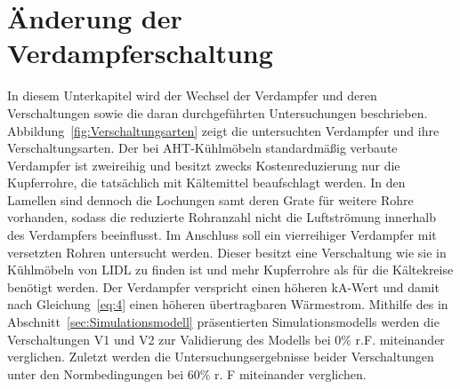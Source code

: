 \clearpage





\section{Änderung der Verdampferschaltung}
\label{sec:Änderung der Verdampferschaltung}

In diesem Unterkapitel wird der Wechsel der Verdampfer und deren Verschaltungen sowie die daran durchgeführten Untersuchungen beschrieben. Abbildung~\ref{fig:Verschaltungsarten} zeigt die untersuchten Verdampfer und ihre Verschaltungsarten. Der bei AHT-Kühlmöbeln standardmäßig verbaute Verdampfer ist zweireihig und besitzt zwecks Kostenreduzierung nur die Kupferrohre, die tatsächlich mit Kältemittel beaufschlagt werden. In den Lamellen sind dennoch die Lochungen samt deren Grate für weitere Rohre vorhanden, sodass die reduzierte Rohranzahl nicht die Luftströmung innerhalb des Verdampfers beeinflusst. Im Anschluss soll ein vierreihiger Verdampfer mit versetzten Rohren untersucht werden. Dieser besitzt eine Verschaltung wie sie in Kühlmöbeln von LIDL zu finden ist und mehr Kupferrohre als für die Kältekreise benötigt werden. Der Verdampfer verspricht einen höheren kA-Wert und damit nach Gleichung~\ref{eq:4} einen höheren übertragbaren Wärmestrom. Mithilfe des in Abschnitt~\ref{sec:Simulationsmodell} präsentierten Simulationsmodells werden die Verschaltungen V1 und V2 zur Validierung des Modells bei \unit{0}{\%} r.F.  miteinander verglichen. Zuletzt werden die Untersuchungsergebnisse beider Verschaltungen unter den Normbedingungen bei \unit{60}{\%} r. F miteinander verglichen.

